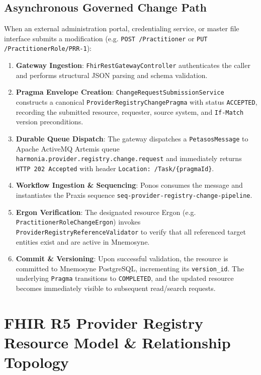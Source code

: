 \subsection{Asynchronous Governed Change Path}
When an external administration portal, credentialing service, or master file interface submits a modification (e.g. \texttt{POST /Practitioner} or \texttt{PUT /PractitionerRole/PRR-1}):
\begin{enumerate}
    \item \textbf{Gateway Ingestion}: \texttt{FhirRestGatewayController} authenticates the caller and performs structural JSON parsing and schema validation.
    \item \textbf{Pragma Envelope Creation}: \texttt{ChangeRequestSubmissionService} constructs a canonical \texttt{ProviderRegistryChangePragma} with status \texttt{ACCEPTED}, recording the submitted resource, requester, source system, and \texttt{If-Match} version preconditions.
    \item \textbf{Durable Queue Dispatch}: The gateway dispatches a \texttt{PetasosMessage} to Apache ActiveMQ Artemis queue \texttt{harmonia.provider.registry.change.request} and immediately returns \texttt{HTTP 202 Accepted} with header \texttt{Location: /Task/\{pragmaId\}}.
    \item \textbf{Workflow Ingestion \& Sequencing}: Ponos consumes the message and instantiates the Praxis sequence \texttt{seq-provider-registry-change-pipeline}.
    \item \textbf{Ergon Verification}: The designated resource Ergon (e.g. \texttt{PractitionerRoleChangeErgon}) invokes \texttt{ProviderRegistryReferenceValidator} to verify that all referenced target entities exist and are active in Mnemosyne.
    \item \textbf{Commit \& Versioning}: Upon successful validation, the resource is committed to Mnemosyne PostgreSQL, incrementing its \texttt{version\_id}. The underlying \texttt{Pragma} transitions to \texttt{COMPLETED}, and the updated resource becomes immediately visible to subsequent read/search requests.
\end{enumerate}

\section{FHIR R5 Provider Registry Resource Model \& Relationship Topology}
\label{sec:pr_resource_model}

